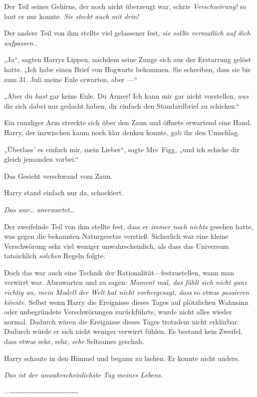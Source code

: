 {Der Teil seines Gehirns, der noch nicht überzeugt war, schrie \emph{Verschwörung!} so laut er nur konnte. \emph{Sie steckt auch mit drin!}

Der andere Teil von ihm stellte viel gelassener fest, \emph{sie sollte vermutlich auf dich aufpassen.}.

„Ja“, sagten Harrys Lippen, nachdem seine Zunge sich aus der Erstarrung gelöst hatte. „Ich habe einen Brief von Hogwarts bekommen. Sie schreiben, dass sie bis zum 31. Juli meine Eule erwarten, aber —“

„Aber du \emph{hast} gar keine Eule. Du Armer! Ich kann mir gar nicht vorstellen, \emph{was} die sich dabei nur gedacht haben, dir einfach den Standardbrief zu schicken.“

Ein runzliger Arm streckte sich über den Zaun und öffnete erwartend eine Hand. Harry, der inzwischen kaum noch klar denken konnte, gab ihr den Umschlag.

„Überlass' es einfach mir, mein Lieber“, sagte Mrs~Figg, „und ich schicke dir gleich jemanden vorbei.“

Das Gesicht verschwand vom Zaun.

Harry stand einfach nur da, schockiert.

\emph{Das war… unerwartet…}

Der zweifelnde Teil von ihm stellte fest, dass er \emph{immer noch nichts} gesehen hatte, was gegen die bekannten Naturgesetze verstieß. Sicherlich war eine kleine Verschwörung sehr viel weniger unwahrscheinlich, als dass das Universum tatsächlich \emph{solchen} Regeln folgte.

Doch das war auch eine Technik der Rationalität—festzustellen, wann man verwirrt war. Abzuwarten und zu sagen: \emph{Moment mal, das fühlt sich nicht ganz richtig an, mein Modell der Welt hat nicht vorhergesagt, dass} so etwas \emph{passieren könnte.} Selbst wenn Harry die Ereignisse dieses Tages auf plötzlichen Wahnsinn oder unbegründete Verschwörungen zurückführte, wurde nicht alles wieder normal. Dadurch wären die Ereignisse dieses Tages trotzdem nicht erklärbar. Dadurch würde er sich nicht weniger verwirrt fühlen. Es bestand kein Zweifel, dass etwas sehr, sehr, \emph{sehr} Seltsames geschah.

Harry schaute in den Himmel und begann zu lachen. Er konnte nicht anders.

\emph{Das ist der unwahrscheinlichste Tag meines Lebens.}

—\/-\/-\/-\/-\/-\/-\/-\/-\/-\/-\/-\/-\/-\/-\/-\/-\/-\/-\/-\/-\/-\/-\/-\/-\/-\/-\/-\/-\/-

}
